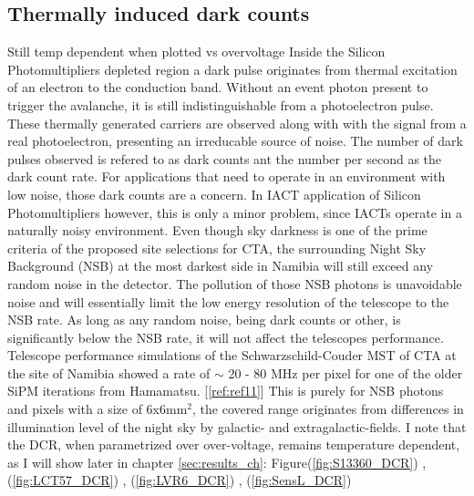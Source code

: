\documentclass[article,type=msc,colorback,accentcolor=tud9c]{tudthesis}
\begin{document}
\subsection{Thermally induced dark counts}
Still temp dependent when plotted vs overvoltage
Inside the Silicon Photomultipliers depleted region a dark pulse originates from thermal excitation of an electron to the conduction band. Without an event photon present to trigger the avalanche, it is still indistinguishable from a photoelectron pulse. These thermally generated carriers are observed along with with the signal from a real photoelectron, presenting an irreducable source of noise. The number of dark pulses observed is refered to as dark counts ant the number per second as the dark count rate. For applications that need to operate in an environment with low noise, those dark counts are a concern. In IACT application of Silicon Photomultipliers however, this is only a minor problem, since IACTs operate in a naturally noisy environment. Even though sky darkness is one of the prime criteria of the proposed site selections for CTA, the surrounding Night Sky Background (NSB) at the most darkest side in Namibia will still exceed any random noise in the detector. The pollution of those NSB photons is unavoidable noise and will essentially limit the low energy resolution of the telescope to the NSB rate. As long as any random noise, being dark counts or other, is significantly below the NSB rate, it will not affect the telescopes performance.\\
Telescope performance simulations of the Schwarzschild-Couder MST of CTA at the site of Namibia showed a rate of $\sim$ 20 - 80 MHz per pixel for one of the older SiPM iterations from Hamamatsu. [\ref{ref:ref11}] This is purely for NSB photons and pixels with a size of 6x6mm$^2$, the covered range originates from differences in illumination level of the night sky by galactic- and extragalactic-fields. 
I note that the DCR, when parametrized over over-voltage, remains temperature dependent, as I will show later in chapter \ref{sec:results_ch}: Figure(\ref{fig:S13360_DCR}) , (\ref{fig:LCT57_DCR}) , (\ref{fig:LVR6_DCR}) , (\ref{fig:SensL_DCR})\\
\end{document}
